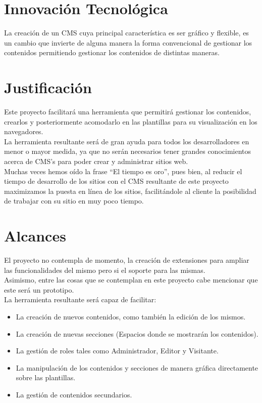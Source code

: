 \section{Innovaci\'on Tecnol\'ogica}
La creaci\'on de un CMS cuya principal caracter\'istica es ser gr\'afico y flexible, es un cambio que invierte de alguna manera la forma convencional de gestionar los contenidos permitiendo gestionar los contenidos de distintas maneras.

\section{Justificaci\'on}
Este proyecto facilitar\'a una herramienta que permitir\'a gestionar los contenidos, crearlos y posteriormente acomodarlo en las plantillas para su visualizaci\'on en los navegadores.\\
La herramienta resultante ser\'a de gran ayuda para todos los desarrolladores en menor o mayor medida, ya que no ser\'an necesarios tener grandes conocimientos acerca de CMS's para poder crear y administrar sitios web.\\
Muchas veces hemos o\'ido la frase ``El tiempo es oro'', pues bien, al reducir el tiempo de desarrollo de los sitios con el CMS resultante de este proyecto maximizamos la puesta en l\'inea de los sitios, facilit\'andole al cliente la posibilidad de trabajar con su sitio en muy poco tiempo.

\section{Alcances}
El proyecto no contempla de momento, la creaci\'on de extensiones para ampliar las funcionalidades del mismo pero si el soporte para las mismas.\\
Asimismo, entre las cosas que se contemplan en este proyecto cabe mencionar que este ser\'a un prototipo.\\
La herramienta resultante ser\'a capaz de facilitar:
\begin{itemize}
\item La creaci\'on de nuevos contenidos, como tambi\'en la edici\'on de los mismos.
\item La creaci\'on de nuevas secciones (Espacios donde se mostrar\'an los contenidos).
\item La gesti\'on de roles tales como Administrador, Editor y Visitante.
\item La manipulaci\'on de los contenidos y secciones de manera gr\'afica directamente sobre las plantillas.
\item La gesti\'on de contenidos secundarios.
\end{itemize}

\clearpage

